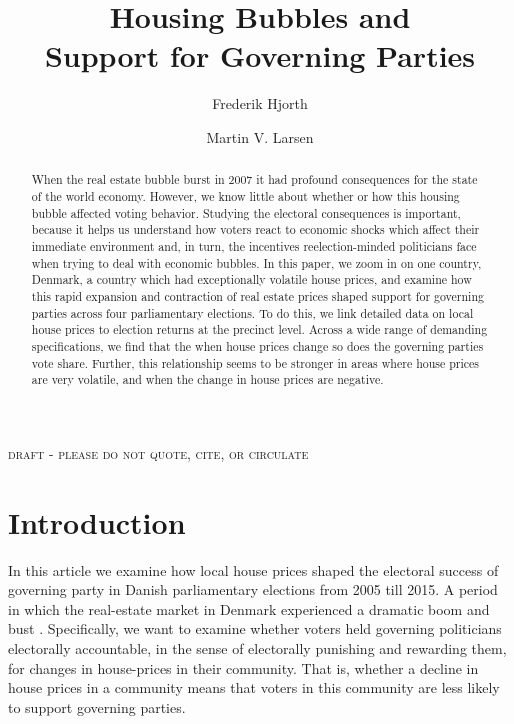 \documentclass[12pt,a4paper]{article}
\title{\textbf{Housing Bubbles and \\Support for Governing Parties}}
\author{
Frederik Hjorth \and Martin V. Larsen}
\begin{document}
\maketitle

\begin{center}
\textsc{draft - please do not quote, cite, or circulate}
\end{center}

\begin{abstract}
\noindent When the real estate bubble burst in 2007 it had profound consequences for the state of the world economy. However, we know little about whether or how this housing bubble affected voting behavior. Studying the electoral consequences is important, because it helps us understand how voters react to economic shocks which affect their immediate environment and, in turn, the incentives reelection-minded politicians face when trying to deal with economic bubbles. In this paper, we zoom in on one country, Denmark, a country which had exceptionally volatile house prices, and examine how this rapid expansion and contraction of real estate prices shaped support for governing parties across four parliamentary elections. To do this, we link detailed data on local house prices to election returns at the precinct level. Across a wide range of demanding specifications, we find that the when house prices change so does the governing parties vote share. Further, this relationship seems to be stronger in areas where house prices are very volatile, and when the change in house prices are negative.
 
\end{abstract}



\newpage

\doublespacing

\section{Introduction}
In this article we examine how local house prices shaped the electoral success of governing party in Danish parliamentary elections from 2005 till 2015. A period in which the real-estate market in Denmark experienced a dramatic boom and bust \citep{dam2011housing}. Specifically, we want to examine whether voters held governing politicians electorally accountable, in the sense of electorally punishing and rewarding them, for changes in house-prices in their community. That is, whether a decline in house prices in a community means that voters in this community are less likely to support governing parties. 
\end{document}
